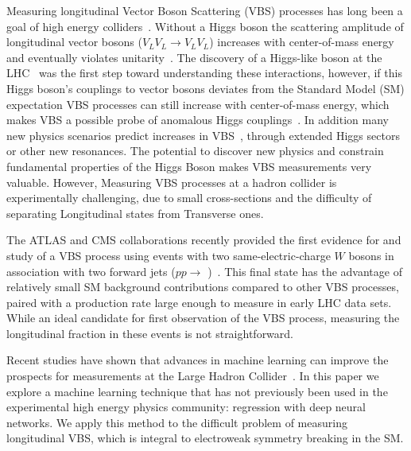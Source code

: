 
Measuring longitudinal Vector Boson Scattering (VBS) processes has long been a goal of high energy colliders~\cite{SSC_1}. Without a Higgs boson the scattering amplitude of longitudinal vector bosons ($V_{L}V_{L} \rightarrow V_{L}V_{L}$) increases with center-of-mass energy and eventually violates unitarity~\cite{Uni_1,Uni_2,Uni_3}. The discovery of a Higgs-like boson at the
LHC~\cite{ATLAS_higgs,CMS_higgs} was the first step toward understanding these interactions, however, if this Higgs boson's couplings to vector bosons deviates from the Standard Model (SM) expectation VBS processes can still increase with center-of-mass energy, which makes VBS a possible probe of anomalous Higgs couplings~\cite{Higgs_con}. In addition many new physics scenarios predict increases in VBS~\cite{Tmatrix,VLVLBSM,Trip_Higgs_old,Trip_higgs_new}, through extended Higgs sectors or
other new resonances. The potential to discover new physics
and constrain fundamental properties of the Higgs Boson makes VBS measurements very valuable. However,  Measuring VBS processes at a hadron collider is experimentally challenging,
due to small cross-sections and the difficulty of separating Longitudinal states from Transverse ones. 

 The ATLAS and CMS collaborations recently provided the first evidence for
 and study of a VBS process using events with two same-electric-charge $W$ bosons in association
with two forward jets ($pp \to$ \ssWW)~\cite{ATLAS_ssWW,CMS_ssWW}.
This final state has the advantage of relatively small SM background
contributions compared to other VBS processes, paired with a
production rate large enough to measure in early LHC data sets.  While
an ideal candidate for first observation of the VBS process, measuring
the longitudinal fraction in these events is not straightforward.

Recent studies have shown that advances in machine learning can
improve the prospects for measurements at the Large Hadron Collider~\cite{Baldi:2014kfa,Baldi:2014pta}.
In this paper we explore a machine learning technique that
has not previously been used in the experimental high energy physics community: regression with deep neural networks. We apply this method to
the difficult problem of measuring longitudinal VBS,
which is integral to  electroweak symmetry breaking in the SM.

